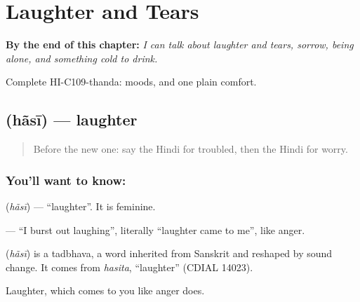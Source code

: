 
\chapter{Laughter and Tears}
\label{ch:hi-laughter-and-tears}

\begin{chapteropening}
\textbf{By the end of this chapter:} \emph{I can talk about laughter and tears, sorrow, being alone, and something cold to drink.}

Complete HI-C109-thanda: moods, and one plain comfort.
\end{chapteropening}

\section[\texorpdfstring{\hi{हँसी} (hãsī)}{हँसी (hãsī)}]{ (hãsī) — laughter}

\label{lesson:HI-C109-hansi}



\begin{quote}
Before the new one: say the Hindi for troubled, then the Hindi for worry.
\end{quote}

\subsection*{You'll want to know: }
\textbf{} (\emph{hãsī}) — \textquotedblleft{}laughter\textquotedblright{}. It is feminine.

\textbf{   } — \textquotedblleft{}I burst out laughing\textquotedblright{}, literally \textquotedblleft{}laughter came to me\textquotedblright{}, like anger.

\begin{cousinweb}
\textbf{} (\emph{hãsī}) is a tadbhava, a word inherited from Sanskrit and reshaped by sound change. It comes from \emph{hasita}, \textquotedblleft{}laughter\textquotedblright{} (CDIAL 14023).
\end{cousinweb}

\begin{grammarlens}[title={What you've built}]
Laughter, which comes to you like anger does.
\end{grammarlens}

